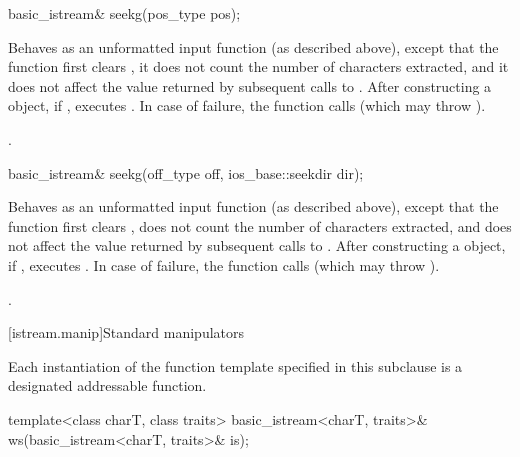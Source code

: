 %
\begin{itemdecl}
basic_istream& seekg(pos_type pos);
\end{itemdecl}

\begin{itemdescr}
\pnum
\effects
Behaves as an unformatted input function (as described above), except that
the function first clears ,
it does not count
the number of characters extracted, and it does not affect the value
returned by subsequent calls to
.
After constructing a  object, if
,
executes
.
In case of failure, the function calls
(which may throw
).

\pnum
\returns
{}.
\end{itemdescr}

%
\begin{itemdecl}
basic_istream& seekg(off_type off, ios_base::seekdir dir);
\end{itemdecl}

\begin{itemdescr}
\pnum
\effects
Behaves as an unformatted input function (as described above), except that the function first clears ,
does not count the number of characters extracted, and
does not affect the value returned by subsequent calls to .
After constructing a  object, if
,
executes
.
In case of failure, the function calls  (which may throw
).

\pnum
\returns
{}.
\end{itemdescr}

[istream.manip]{Standard  manipulators}

\pnum
Each instantiation of the function template
specified in this subclause
is a designated addressable function.

%
\begin{itemdecl}
template<class charT, class traits>
  basic_istream<charT, traits>& ws(basic_istream<charT, traits>& is);
\end{itemdecl}

